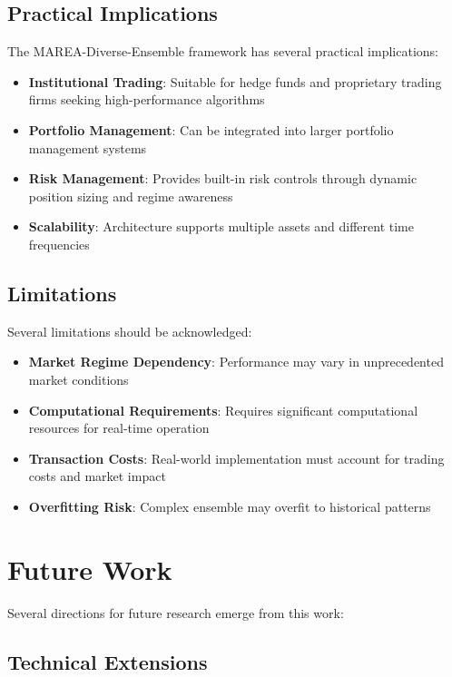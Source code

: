 \documentclass[10pt,twocolumn]{article}
\begin{document}
\subsection{Practical Implications}

The MAREA-Diverse-Ensemble framework has several practical implications:

\begin{itemize}[itemsep=1pt]
\item \textbf{Institutional Trading}: Suitable for hedge funds and proprietary trading firms seeking high-performance algorithms
\item \textbf{Portfolio Management}: Can be integrated into larger portfolio management systems
\item \textbf{Risk Management}: Provides built-in risk controls through dynamic position sizing and regime awareness
\item \textbf{Scalability}: Architecture supports multiple assets and different time frequencies
\end{itemize}

\subsection{Limitations}

Several limitations should be acknowledged:

\begin{itemize}[itemsep=1pt]
\item \textbf{Market Regime Dependency}: Performance may vary in unprecedented market conditions
\item \textbf{Computational Requirements}: Requires significant computational resources for real-time operation
\item \textbf{Transaction Costs}: Real-world implementation must account for trading costs and market impact
\item \textbf{Overfitting Risk}: Complex ensemble may overfit to historical patterns
\end{itemize}

\section{Future Work}

Several directions for future research emerge from this work:

\subsection{Technical Extensions}
\end{document}
